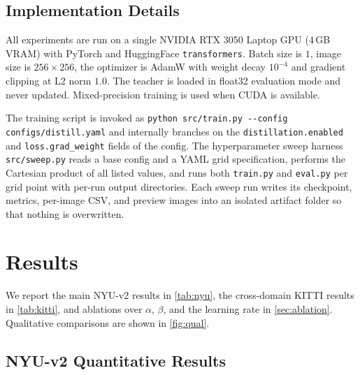 \documentclass[10pt,twocolumn,letterpaper]{article}
\begin{document}
\subsection{Implementation Details}
\label{sec:impl}

All experiments are run on a single NVIDIA RTX 3050 Laptop GPU (4\,GB
VRAM) with PyTorch and HuggingFace
\texttt{transformers}. Batch size is $1$, image size is $256{\times}256$,
the optimizer is AdamW with weight decay $10^{-4}$ and gradient clipping
at L2 norm $1.0$. The teacher is loaded in float32 evaluation mode and
never updated. Mixed-precision training is used when CUDA is available.

The training script is invoked as
\texttt{python src/train.py {-}{-}config configs/distill.yaml} and
internally branches on the \texttt{distillation.enabled} and
\texttt{loss.grad\_weight} fields of the config. The hyperparameter
sweep harness \texttt{src/sweep.py} reads a base config and a YAML grid
specification, performs the Cartesian product of all listed values, and
runs both \texttt{train.py} and \texttt{eval.py} per grid point with
per-run output directories. Each sweep run writes its checkpoint,
metrics, per-image CSV, and preview images into an isolated artifact
folder so that nothing is overwritten.

\section{Results}
\label{sec:results}

We report the main NYU-v2 results in \cref{tab:nyu}, the cross-domain
KITTI results in \cref{tab:kitti}, and ablations over $\alpha$, $\beta$,
and the learning rate in \cref{sec:ablation}. Qualitative comparisons
are shown in \cref{fig:qual}.

\subsection{NYU-v2 Quantitative Results}
\label{sec:nyu}
\end{document}
